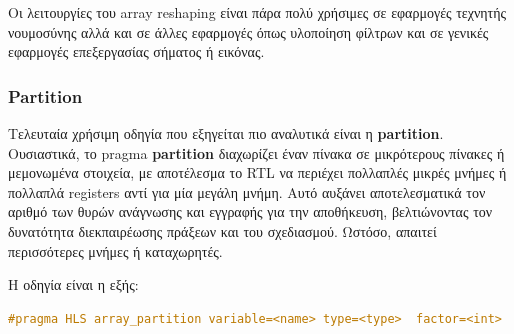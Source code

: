 Οι λειτουργίες του array reshaping είναι πάρα πολύ χρήσιμες σε εφαρμογές τεχνητής νουμοσύνης αλλά και σε άλλες εφαρμογές όπως υλοποίηση φίλτρων και σε γενικές εφαρμογές επεξεργασίας σήματος ή εικόνας.
  
\subsubsection{Partition}
Τελευταία χρήσιμη οδηγία που εξηγείται πιο αναλυτικά είναι η \textbf{partition}.
Ουσιαστικά, το pragma \textbf{partition} διαχωρίζει έναν πίνακα σε μικρότερους πίνακες ή μεμονωμένα στοιχεία, με αποτέλεσμα το RTL να περιέχει πολλαπλές μικρές μνήμες ή πολλαπλά registers αντί για μία μεγάλη μνήμη.
Αυτό αυξάνει αποτελεσματικά τον αριθμό των θυρών ανάγνωσης και εγγραφής για την αποθήκευση, βελτιώνοντας τον δυνατότητα διεκπαιρέωσης πράξεων και του σχεδιασμού. Ωστόσο, απαιτεί περισσότερες μνήμες ή καταχωρητές.

Η οδηγία είναι η εξής:
\begin{lstlisting}[language=C++, caption={Οδηγία Partitioning}]
  #pragma HLS array_partition variable=<name> type=<type>  factor=<int>  dim=<int> off=true
\end{lstlisting}

